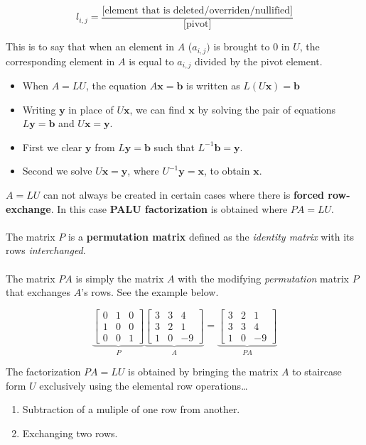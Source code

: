 \documentclass[12pt]{article}
\newcommand{\bm}[1]{\mathbf{{#1}}}
\newcommand{\mb}{\begin{bmatrix}}
\newcommand{\me}{\end{bmatrix}}
\begin{document}
$$l_{i,j} = \frac{\textrm{[element that is deleted/overriden/nullified]}}{\textrm{[pivot]}}$$

This is to say that when an element in $A$ ($a_{i,j})$ is brought to $0$ in $U$, the corresponding element in $A$
is equal to $a_{i,j}$ divided by the pivot element.

\begin{itemize}
    \item When $A = LU$, the equation $A\bm{x} = \bm{b}$ is written as $L(U\bm{x}) = \bm{b}$
    \item Writing $\bm{y}$ in place of $U\bm{x}$, we can find $\bm{x}$ by solving the pair of equations $L\bm{y} = \bm{b}$ and $U\bm{x} = \bm{y}$.
    \item First we clear $\bm{y}$ from $L\bm{y} = \bm{b}$ such that $L^{-1}\bm{b} = \bm{y}$.
    \item Second we solve $U\bm{x} = \bm{y}$, where $U^{-1}\bm{y = x}$, to obtain $\bm{x}$.
\end{itemize}

$A = LU$ can not always be created in certain cases where there is \textbf{forced row-exchange}. In this case
\textbf{PALU factorization} is obtained where $PA = LU$. \\ \\

The matrix $P$ is a \textbf{permutation matrix} defined as the \emph{identity matrix} with its rows \emph{interchanged}. \\ \\

The matrix $PA$ is simply the matrix $A$ with the modifying \emph{permutation} matrix $P$ that exchanges $A$'s rows. See the example below.

$$\underbrace{\mb 0 & 1 & 0 \\ 1 & 0 & 0 \\ 0 & 0 & 1 \me}_P \underbrace{\mb 3 & 3 & 4 \\ 3 & 2 & 1 \\ 1 & 0 & -9 \me}_A = \underbrace{\mb 3 & 2 & 1 \\ 3 & 3 & 4 \\ 1 & 0 & -9 \me}_{PA}$$

The factorization $PA = LU$ is obtained by bringing the matrix $A$ to staircase form $U$ exclusively using the elemental row operations\dots

\begin{enumerate}
    \item Subtraction of a muliple of one row from another.
    \item Exchanging two rows.
\end{enumerate}
\end{document}
